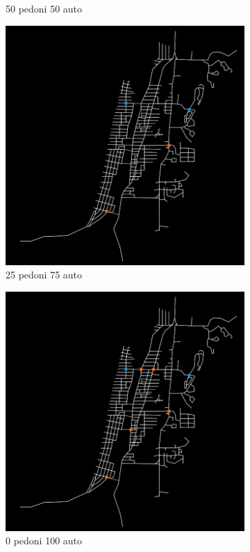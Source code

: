 \begin{figure}
\begin{subfigure}{0.475\textwidth}
        \caption{50 pedoni 50 auto}
    \end{subfigure}
    \begin{subfigure}{0.475\textwidth}
        \centering
        \includegraphics[width=\textwidth]{images/analisi/comparison-new-in-out-flow-25-75-car.png}
        \caption{25 pedoni 75 auto}
    \end{subfigure}
    \begin{subfigure}{0.475\textwidth}
        \centering
        \includegraphics[width=\textwidth]{images/analisi/comparison-new-in-out-flow-0-100-car.png}
        \caption{0 pedoni 100 auto}
    \end{subfigure}
    \caption{}
    \label{fig:analisi-comparison-in-out-flow-map-new}
\end{figure}

